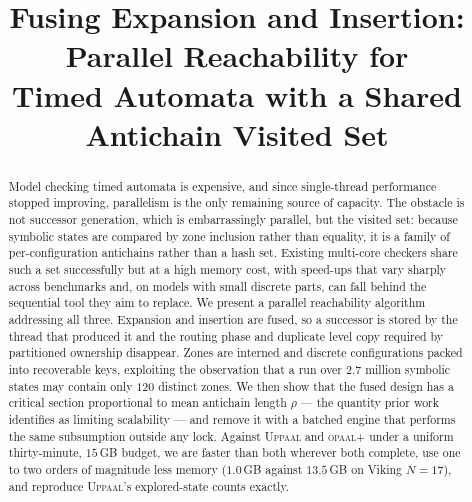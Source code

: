 \documentclass[11pt]{article}
\title{Fusing Expansion and Insertion: Parallel Reachability for\\Timed Automata with a Shared Antichain Visited Set}
\author{}
\date{}
\begin{document}
\maketitle

\begin{abstract}
Model checking timed automata is expensive, and since single-thread performance
stopped improving, parallelism is the only remaining source of capacity. The obstacle is not
successor generation, which is embarrassingly parallel, but the visited set: because symbolic
states are compared by zone inclusion rather than equality, it is a family of per-configuration
antichains rather than a hash set. Existing multi-core checkers share such a set successfully
but at a high memory cost, with speed-ups that vary sharply across benchmarks and, on models
with small discrete parts, can fall behind the sequential tool they aim to replace. We present
a parallel reachability algorithm addressing all three. Expansion and insertion are fused, so
a successor is stored by the thread that produced it and the routing phase and duplicate level
copy required by partitioned ownership disappear. Zones are interned and discrete
configurations packed into recoverable keys, exploiting the observation that a run over $2.7$
million symbolic states may contain only $120$ distinct zones. We then show that the fused
design has a critical section proportional to mean antichain length $\rho$ --- the quantity
prior work identifies as limiting scalability --- and remove it with a batched engine that
performs the same subsumption outside any lock. Against \textsc{Uppaal} and
\textsc{opaal}+\ltsmin{} under a uniform thirty-minute, $15$\,GB budget, we are faster than
both wherever both complete, use one to two orders of magnitude less memory ($1.0$\,GB against
$13.5$\,GB on Viking $N{=}17$), and reproduce \textsc{Uppaal}'s explored-state counts exactly.
\end{abstract}








\end{document}
